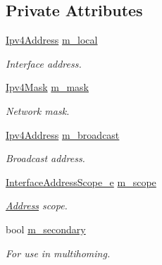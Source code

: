 \subsection*{Private Attributes}
\begin{DoxyCompactItemize}
\item 
\hyperlink{classns3_1_1Ipv4Address}{Ipv4\+Address} \hyperlink{classns3_1_1Ipv4InterfaceAddress_aab42696a9bf794d07922304af6c57cbc}{m\+\_\+local}
\begin{DoxyCompactList}\small\item\em Interface address. \end{DoxyCompactList}\item 
\hyperlink{classns3_1_1Ipv4Mask}{Ipv4\+Mask} \hyperlink{classns3_1_1Ipv4InterfaceAddress_a5154032ec6a8e3257a6b2ba48993767d}{m\+\_\+mask}
\begin{DoxyCompactList}\small\item\em Network mask. \end{DoxyCompactList}\item 
\hyperlink{classns3_1_1Ipv4Address}{Ipv4\+Address} \hyperlink{classns3_1_1Ipv4InterfaceAddress_a4608b56a1d8a3fb4ae5b10db2b5882d1}{m\+\_\+broadcast}
\begin{DoxyCompactList}\small\item\em Broadcast address. \end{DoxyCompactList}\item 
\hyperlink{classns3_1_1Ipv4InterfaceAddress_a329cea433e74f717c26c9e51c4fcd3d8}{Interface\+Address\+Scope\+\_\+e} \hyperlink{classns3_1_1Ipv4InterfaceAddress_aaed017930f52bd9110673078a72e480d}{m\+\_\+scope}
\begin{DoxyCompactList}\small\item\em \hyperlink{classns3_1_1Address}{Address} scope. \end{DoxyCompactList}\item 
bool \hyperlink{classns3_1_1Ipv4InterfaceAddress_a4c84fd58f6c2f35f79202bb4163cdfe3}{m\+\_\+secondary}
\begin{DoxyCompactList}\small\item\em For use in multihoming. \end{DoxyCompactList}\end{DoxyCompactItemize}
